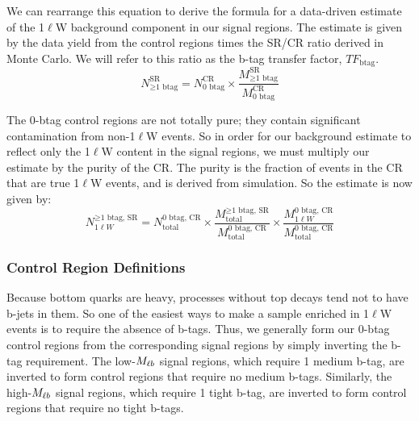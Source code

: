 We can rearrange this equation to derive the formula for
a data-driven estimate of the 1$\ell$W background component in our
signal regions. The estimate is given by the data yield from the control regions times
the SR/CR ratio derived in Monte Carlo. We will refer to this ratio as
the b-tag transfer factor, $TF_\text{btag}$.
\begin{equation}
\label{eq:stop:1lw:estimateimpure}
N_{\geq\text{1 btag}}^\text{SR} = N_\text{0 btag}^\text{CR} \times
\frac{M_{\geq\text{1 btag}}^\text{SR}}{M_\text{0 btag}^\text{CR}}
\end{equation}

The 0-btag control regions are not totally pure; they contain significant
contamination from non-1$\ell$W events. So in order for
our background estimate to reflect only the 1$\ell$W content in the
signal regions, we must multiply our estimate by the purity of the
CR. The purity is the fraction of events in the CR that are true
1$\ell$W events, and is derived from simulation. So the estimate is
now given by:
\begin{equation}
\label{eq:stop:1lw:estimatepure}
N_{1\ell W}^{\geq\text{1 btag, SR}} = N_\text{total}^\text{0 btag, CR} \times
\frac{M_\text{total}^{\geq\text{1 btag, SR}}}{M_\text{total}^\text{0 btag, CR}} \times
\frac{M_{1\ell W}^\text{0 btag, CR}}{M_\text{total}^\text{0 btag, CR}}
\end{equation}

\subsubsection{Control Region Definitions}
\label{sssec:stop:1lw:crdefinitions}

Because bottom quarks are heavy, processes without top decays tend not to
have b-jets in them. So one of the easiest ways to make a sample
enriched in 1$\ell$W events is to require the absence of b-tags.
Thus, we generally form our 0-btag control regions from the
corresponding signal regions by simply inverting
the b-tag requirement. The low-$M_{\ell b}$ signal regions, which
require 1 medium b-tag, are inverted to form control regions that require no medium
b-tags. Similarly, the high-$M_{\ell b}$ signal regions, which require
1 tight b-tag, are inverted to form control regions that require no
tight b-tags.

